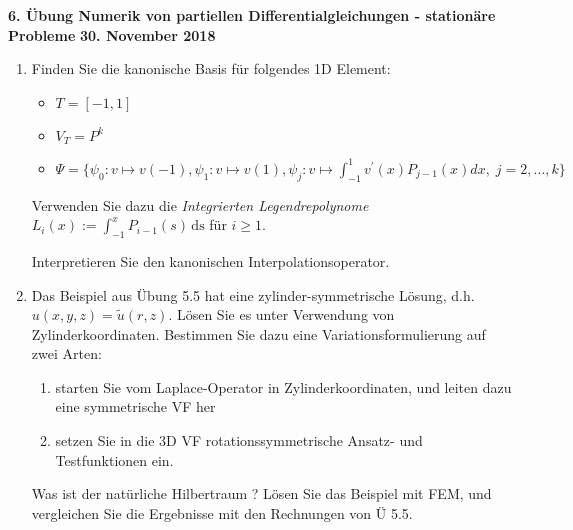 \documentclass[11pt,a4paper]{report}
\newcommand{\R}[1]{\mathbb{R}^{#1}}
\begin{document}
\begin{center}
\textbf{6. \"Ubung Numerik von partiellen Differentialgleichungen - station\"are Probleme} \newline 
\textbf{30. November 2018}
\end{center}
\begin{enumerate}


\item
Finden Sie die kanonische Basis  f\"ur folgendes 1D Element: 
\begin{itemize}
\item $T = [-1,1]$
\item $V_T = P^k$
\item $\Psi = \{ \psi_0 : v \mapsto v(-1), \psi_1 : v \mapsto v(1),  \psi_j : v \mapsto \int_{-1}^1 v^\prime(x) P_{j-1}(x)  dx,  \; j = 2, \ldots, k \}$ 
\end {itemize}
Verwenden Sie dazu die {\em Integrierten Legendrepolynome} $L_i(x) :=
\int_{-1}^x P_{i-1}(s) \, \text{ds}$ f\"ur $i \geq 1$.

Interpretieren Sie den kanonischen Interpolationsoperator.


\item Das Beispiel aus \"Ubung 5.5 hat eine zylinder-symmetrische
  L\"osung, d.h. $u(x,y,z) = \tilde u(r,z)$.  L\"osen Sie es unter Verwendung von Zylinderkoordinaten.
Bestimmen Sie dazu eine Variationsformulierung auf zwei Arten:
\begin{enumerate}
\item starten Sie vom Laplace-Operator in Zylinderkoordinaten, und
  leiten dazu eine symmetrische VF her
\item setzen Sie in die 3D VF rotationssymmetrische Ansatz- und
  Testfunktionen ein.
\end{enumerate}
Was ist der nat\"urliche Hilbertraum ?
L\"osen Sie das Beispiel mit FEM, und vergleichen Sie die Ergebnisse mit den Rechnungen von \"U 5.5.


\end{enumerate}
\end{document}
